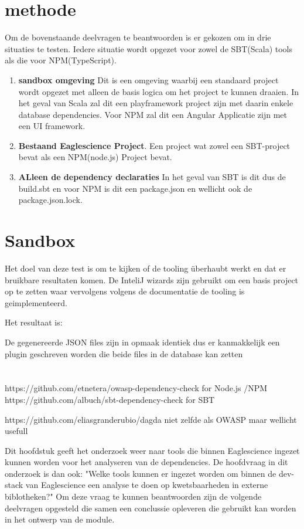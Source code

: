 \section{methode}
Om de bovenstaande deelvragen te beantwoorden is er gekozen om in drie situaties te testen. Iedere situatie wordt opgezet voor zowel de SBT(Scala) tools als die voor NPM(TypeScript).
\begin{enumerate}
    \item \textbf{sandbox omgeving} Dit is een omgeving waarbij een standaard project wordt opgezet met alleen de basis logica om het project te kunnen draaien. In het geval van Scala zal dit een playframework project zijn met daarin enkele database dependencies. Voor NPM zal dit een Angular Applicatie zijn met een UI framework.
    \item \textbf{Bestaand Eaglescience Project}. Een project wat zowel een SBT-project bevat als een NPM(node.js) Project bevat.
    \item \textbf{ALleen de dependency declaraties} In het geval van SBT is dit dus de build.sbt en voor NPM is dit  een package.json en wellicht ook de package.json.lock.
\end{enumerate}

\section{Sandbox}
Het doel van deze test is om te kijken of de tooling überhaubt werkt en dat er bruikbare resultaten komen. De InteliJ wizards zijn gebruikt om een basis project op te zetten waar vervolgens volgens de documentatie de tooling is geimplementeerd.

Het resultaat is:

De gegenereerde JSON files zijn in opmaak identiek dus er kanmakkelijk een plugin geschreven worden die beide files in de database kan zetten
\section{}

https://github.com/etnetera/owasp-dependency-check for Node.js /NPM
https://github.com/albuch/sbt-dependency-check for SBT

https://github.com/eliasgranderubio/dagda niet zelfde als OWASP maar wellicht usefull


Dit hoofdstuk geeft het onderzoek weer naar tools die binnen Eaglescience ingezet kunnen worden voor het analyseren van de dependencies. De hoofdvraag in dit onderzoek is dan ook: "Welke tools kunnen er ingezet worden om binnen de dev-stack van Eaglescience een analyse te doen op kwetsbaarheden in externe biblotheken?" Om deze vraag te kunnen beantwoorden zijn de volgende deelvragen opgesteld die samen een conclussie opleveren die gebruikt kan worden in het ontwerp van de module.



